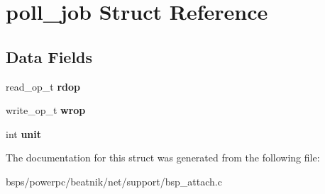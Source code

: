 \hypertarget{structpoll__job}{}\section{poll\+\_\+job Struct Reference}
\label{structpoll__job}
\subsection*{Data Fields}
\begin{DoxyCompactItemize}
\item 
\mbox{\label{structpoll__job_a03db6c83111ffe67b6830d78584f7c03}} 
read\+\_\+op\+\_\+t {\bfseries rdop}
\item 
\mbox{\label{structpoll__job_a083ab47ef6bcaa5d4b28e3e9180ec70d}} 
write\+\_\+op\+\_\+t {\bfseries wrop}
\item 
\mbox{\label{structpoll__job_afab866dc6e13b7978721752fc9bad2b8}} 
int {\bfseries unit}
\end{DoxyCompactItemize}


The documentation for this struct was generated from the following file\+:\begin{DoxyCompactItemize}
\item 
bsps/powerpc/beatnik/net/support/bsp\+\_\+attach.\+c\end{DoxyCompactItemize}
